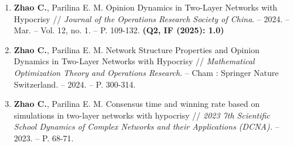 \documentclass[letterpaper,10pt]{article}
\begin{document}
\begin{enumerate}[itemsep=2pt,parsep=0pt]
  \item \textbf{Zhao C.}, Parilina E. M. Opinion Dynamics in Two-Layer Networks with Hypocrisy // {\it Journal of the Operations Research Society of China}. -- 2024. -- Mar. -- Vol. 12, no. 1. -- P. 109-132. {\bf (Q2, IF (2025): 1.0)}
  \item \textbf{Zhao C.}, Parilina E. M. Network Structure Properties and Opinion Dynamics in Two-Layer Networks with Hypocrisy // {\it Mathematical Optimization Theory and Operations Research}. -- Cham : Springer Nature Switzerland. -- 2024. -- P. 300-314.
  \item \textbf{Zhao C.}, Parilina E. M. Consensus time and winning rate based on simulations in two-layer networks with hypocrisy // {\it 2023 7th Scientific School Dynamics of Complex Networks and their Applications (DCNA).} -- 2023. -- P. 68-71.
\end{enumerate}
\end{document}
